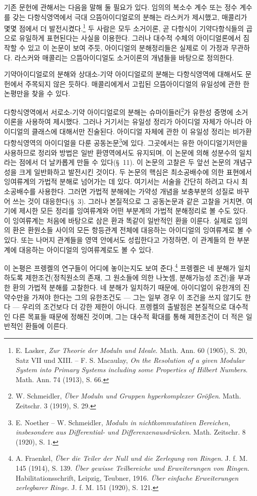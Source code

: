 기존 문헌에 관해서는 다음을 말해 둘 필요가 있다. 임의의 복소수 계수 또는 정수 계수를 갖는 다항식영역에서 극대 으뜸아이디얼로의 분해는 라스커가 제시했고, 매콜리가 몇몇 점에서 더 발전시켰다.\footnote{E. Lasker, \emph{Zur Theorie der Moduln und Ideale}. Math. Ann. 60 (1905), S. 20, Satz VII und XIII. -- F. S. Macaulay, \emph{On the Resolution of a given Modular System into Primary Systems including some Properties of Hilbert Numbers}. Math. Ann. 74 (1913), S. 66.} 두 사람은 모두 소거이론, 곧 다항식이 기약다항식들의 곱으로 유일하게 표현된다는 사실을 이용한다. 그러나 대수적 수체의 아이디얼론에서 짐작할 수 있고 이 논문이 보여 주듯, 아이디얼의 분해정리들은 실제로 이 가정과 무관하다. 라스커와 매콜리는 으뜸아이디얼도 소거이론의 개념들을 바탕으로 정의한다.

기약아이디얼로의 분해와 상대소-기약 아이디얼로의 분해는 다항식영역에 대해서도 문헌에서 주목되지 않은 듯하다. 매콜리에게서 고립된 으뜸아이디얼의 유일성에 관한 한 논평만을 찾을 수 있다.

다항식영역에서 서로소-기약 아이디얼로의 분해는 슈마이들러\footnote{W. Schmeidler, \emph{Über Moduln und Gruppen hyperkomplexer Größen}. Math. Zeitschr. 3 (1919), S. 29.}가 유한성 증명에 소거이론을 사용하여 제시했다. 그러나 거기서는 유일성 정리가 아이디얼 자체가 아니라 아이디얼의 클래스에 대해서만 진술된다. 아이디얼 자체에 관한 이 유일성 정리는 비가환 다항식영역의 아이디얼을 다룬 공동논문\footnote{E. Noether -- W. Schmeidler, \emph{Moduln in nichtkommutativen Bereichen, insbesondere aus Differential- und Differenzenausdrücken}. Math. Zeitschr. 8 (1920), S. 1.}에 있다. 그곳에서는 유한 아이디얼기저만을 사용하므로 정리와 방법은 일반 환영역에서도 유지되며, 이 논문에 의해 성분수의 일치라는 점에서 더 날카롭게 만들 수 있다(\S~11). 이 논문의 고찰은 두 앞선 논문의 개념구성을 크게 일반화하고 발전시킨 것이다. 두 논문의 핵심은 최소공배수에 의한 표현에서 잉여류계의 가법적 분해로 넘어가는 데 있다. 여기서는 서술을 간단히 하려고 다시 최소공배수를 사용한다. 그러면 가법적 분해에는 가약성 개념을 보충부분의 성질로 바꾸어 쓰는 것이 대응한다(\S~3). 그러나 본질적으로 그 공동논문과 같은 고찰을 거치면, 여기에 제시한 모든 정리를 잉여류계와 어떤 부분계의 가법적 분해정리로 볼 수도 있다. 이 잉여류계는 처음에 바탕으로 삼은 환과 똑같이 일반적인 환을 이룬다. 실제로 임의의 환은 환원소들 사이의 모든 항등관계 전체에 대응하는 아이디얼의 잉여류계로 볼 수 있다. 또는 나머지 관계들을 영역 안에서도 성립한다고 가정하면, 이 관계들의 한 부분계에 대응하는 아이디얼의 잉여류계로도 볼 수 있다.

이 논평은 프렝켈의 연구들이 어디에 놓이는지도 보여 준다.\footnote{A. Fraenkel, \emph{Über die Teiler der Null und die Zerlegung von Ringen}. J. f. M. 145 (1914), S. 139. \emph{Über gewisse Teilbereiche und Erweiterungen von Ringen}. Habilitationsschrift, Leipzig, Teubner, 1916. \emph{Über einfache Erweiterungen zerlegbarer Ringe}. J. f. M. 151 (1920), S. 121.} 프렝켈은 네 분해가 일치하도록 제한조건(정칙원소의 존재, 그 원소들에 의한 나눗셈, 분해가능성 조건)을 부과한 환의 가법적 분해를 고찰한다. 네 분해가 일치하기 때문에, 아이디얼이 유한개의 진약수만을 가져야 한다는 그의 유한조건도 --- 그는 일부 경우 이 조건을 쓰지 않기도 한다 --- 우리의 조건보다 더 강한 제한이 아니다. 프렝켈의 출발점은 본질적으로 대수적인 다른 목표들 때문에 정해진 것이며, 그는 대수적 확대를 통해 제한조건이 더 적은 일반적인 환들에 이른다.

